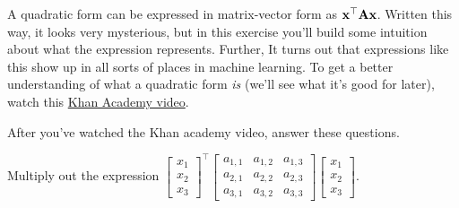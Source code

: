 \documentclass[assignment02_Solutions]{subfiles}
\begin{document}
\begin{exercise}[(15 minutes)]
A quadratic form can be expressed in matrix-vector form as $\mathbf{x}^\top \mathbf{A} \mathbf{x}$.  Written this way, it looks very mysterious, but in this exercise you'll build some intuition about what the expression represents. Further, It turns out that expressions like this show up in all sorts of places in machine learning.   To get a better understanding of what a quadratic form \emph{is} (we'll see what it's good for later), watch this \href{https://www.khanacademy.org/math/multivariable-calculus/applications-of-multivariable-derivatives/quadratic-approximations/v/expressing-a-quadratic-form-with-a-matrix}{Khan Academy video}.

After you've watched the Khan academy video, answer these questions.

\bes
\item Multiply out the expression $\begin{bmatrix} x_1 \\ x_2 \\ x_3 \end{bmatrix}^\top \begin{bmatrix} a_{1,1} & a_{1,2} & a_{1,3} \\ a_{2,1} & a_{2,2} & a_{2,3} \\ a_{3,1} & a_{3,2} & a_{3,3} \end{bmatrix}\begin{bmatrix} x_1 \\ x_2 \\ x_3 \end{bmatrix}$.


\end{exercise}
\end{document}
